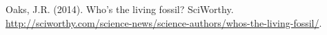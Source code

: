 \myHangIndent
Oaks, J.R.
(2014).
Who's the living fossil?
SciWorthy.
\href{http://sciworthy.com/science-news/science-authors/whos-the-living-fossil/}{
    http://sciworthy.com/\allowbreak{}science-news/\allowbreak{}science-authors/\allowbreak{}whos-the-living-fossil/}.

